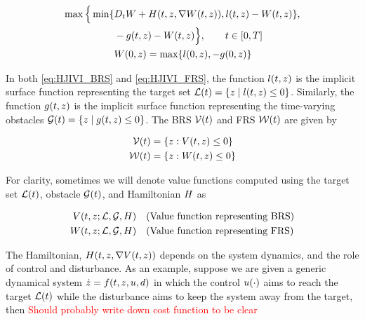 \begin{equation}
\label{eq:HJIVI_FRS}
\begin{aligned}
\max \Big\{ \min \{&D_t \valfuncfwd + \ham(t, \state, \nabla \valfuncfwd(t, \state)), \ic(t, \state) - \valfuncfwd(t, \state) \}, \\
&-\obsfunc(t, \state) - \valfuncfwd(t, \state) \Big\}, \qquad t \in [0, T] \\
&\valfuncfwd(0, \state) = \max\{\fc(0, \state), -\obsfunc(0, \state)\}
\end{aligned}
\end{equation}

In both \eqref{eq:HJIVI_BRS} and \eqref{eq:HJIVI_FRS}, the function  $l(t, z)$ is the implicit surface function representing the target set $\mathcal{L}(t) = \{z \mid l(t, z) \le 0\}$. Similarly, the function $g(t, z)$ is the implicit surface function representing the time-varying obstacles $\mathcal{G}(t) = \{z \mid g(t,z)\le 0\}$. The BRS $\mathcal{V}(t)$ and FRS $\mathcal{W}(t)$ are given by

\begin{equation}
\label{eq:implicitValfuncs}
\begin{aligned}
\brs(t) &= \{\state: \valfunc(t, \state) \le 0\} \\
\frs(t) &= \{\state: \valfuncfwd(t, \state) \le 0 \}
\end{aligned}
\end{equation}

 For clarity, sometimes we will denote value functions computed using the target set $\mathcal{L}(t)$, obstacle $\mathcal{G}(t)$, and Hamiltonian $H$ as 

\begin{equation}
\begin{aligned}
V(t, z; \mathcal{L}, \mathcal{G}, H) &\quad \text{(Value function representing BRS)} \\
W(t, z; \mathcal{L}, \mathcal{G}, H) &\quad \text{(Value function representing FRS)}
\end{aligned}
\end{equation}

The Hamiltonian, $H(t, z, \nabla V(t,z))$ depends on the system dynamics, and the role of control and disturbance. As an example, suppose we are given a generic dynamical system $\dot {z} = f(t, z, u, d)$ in which the control $u(\cdot)$ aims to reach the target $\mathcal{L}(t)$ while the disturbance aims to keep the system away from the target, then \textcolor{red}{Should probably write down cost function to be clear}


